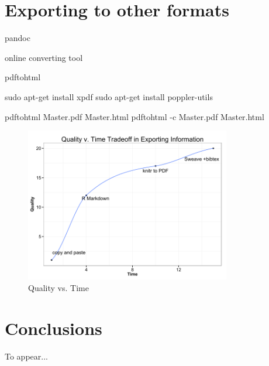 \documentclass[man]{apa6}\usepackage{knitr}
\begin{document}

\section{Exporting to other formats}

pandoc

online converting tool

pdftohtml

sudo apt-get install xpdf
sudo apt-get install poppler-utils %

pdftohtml Master.pdf Master.html %
pdftohtml -c Master.pdf Master.html %

\begin{figure}
\centering
\includegraphics[width=0.8\textwidth]{qualityvstime.png}
\caption{Quality vs. Time}
\label{fig:qualityvstime}
\end{figure}


\section{Conclusions}

To appear...


\printbibliography
\end{document}
